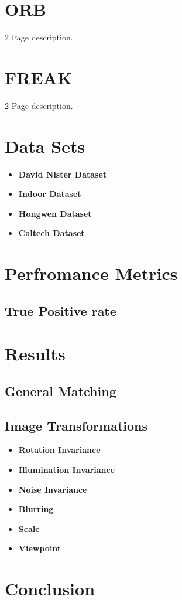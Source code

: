 \section{ORB}
2 Page description. 

\section{FREAK}
2 Page description. 

\section{Data Sets}
\begin{itemize}
\item \textbf{David Nister Dataset}
\item \textbf{Indoor Dataset}
\item \textbf{Hongwen Dataset}
\item \textbf{Caltech Dataset}
\end{itemize}

\section{Perfromance Metrics}
\subsection{True Positive rate}

\section{Results}
\subsection{General Matching}
\subsection{Image Transformations}
\begin{itemize}
\item \textbf{Rotation Invariance}
\item \textbf{Illumination Invariance}
\item  \textbf{Noise Invariance}
\item \textbf{Blurring}
\item \textbf{Scale}
\item \textbf{Viewpoint}
\end{itemize}
\section{Conclusion}
